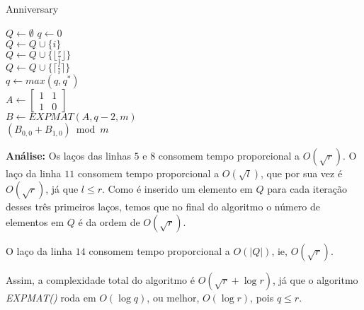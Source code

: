 \begin{algorithm}
\caption{Anniversary}
\begin{algorithmic}[1]

\State $Q \gets \emptyset$
\State $q \gets 0$
\\
\State $Q \gets Q\cup\{i\}$
\EndFor
\\
\State $Q \gets Q\cup\{\lfloor \frac{r}{i} \rfloor \}$
\EndFor
\\
\State $Q \gets Q\cup\{\lceil \frac{l}{i} \rceil \}$
\EndFor
\\
\State $q \gets max(q, q^*)$
\EndIf
\EndFor
\\
\State $A \gets 
\begin{bmatrix}
       1 & 1           \\[0.3em]
       1 & 0
\end{bmatrix}
$
\\
\State $B \gets EXPMAT(A, q-2, m) $
\\
\State \Return $(B_{0,0}+B_{1,0}) \bmod m$
\EndProcedure
\end{algorithmic}
\end{algorithm}


\textbf{Análise:}
Os laços das linhas $5$ e $8$ consomem tempo proporcional a $O(\sqrt{r})$. O laço da linha $11$ consomem tempo proporcional a $O(\sqrt{l})$, que por sua vez é $O(\sqrt{r})$, já que $l\leq r$. Como é inserido um elemento em $Q$ para cada iteração desses três primeiros laços, temos que no final do algoritmo o número de elementos em $Q$ é da ordem de $O(\sqrt{r})$.

O laço da linha $14$ consomem tempo proporcional a $O(|Q|)$, ie, $O(\sqrt{r})$.

Assim, a complexidade total do algoritmo é $O(\sqrt{r} + \log r)$, já que o algoritmo \textit{EXPMAT()} roda em $O(\log q)$, ou melhor, $O(\log r)$, pois $q \leq r$. 


